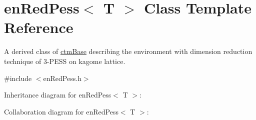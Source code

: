 \hypertarget{classenRedPess}{}\section{en\+Red\+Pess$<$ T $>$ Class Template Reference}
\label{classenRedPess}


A derived class of \hyperlink{classctmBase}{ctm\+Base} describing the environment with dimension reduction technique of 3-\/\+P\+E\+SS on kagome lattice.  




{\ttfamily \#include $<$en\+Red\+Pess.\+h$>$}



Inheritance diagram for en\+Red\+Pess$<$ T $>$\+:


Collaboration diagram for en\+Red\+Pess$<$ T $>$\+:
